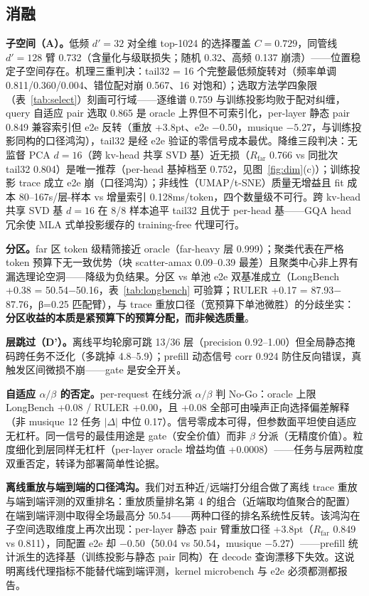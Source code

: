 \documentclass[11pt]{article}
\begin{document}
\subsection{消融}

\textbf{子空间（A）。}低频 $d'{=}32$ 对全维 top-1024 的选择覆盖 $C{=}0.729$，同管线 $d'{=}128$ 臂 0.732（含量化与级联损失；随机 0.32、高频 0.137 崩溃）——位置稳定子空间存在。机理三重判决：tail32 = 16 个完整最低频旋转对（频率单调 0.811/0.360/0.004、错位配对崩 0.567、16 对饱和）；选取方法学四象限（表~\ref{tab:select}）刻画可行域——逐维谱 0.759 与训练投影均败于配对纠缠，query 自适应 pair 选取 0.865 是 oracle 上界但不可索引化，per-layer 静态 pair 0.849 兼容索引但 e2e 反转（重放 +3.8pt、e2e $-0.50$，musique $-5.27$，与训练投影同构的口径鸿沟），tail32 是经 e2e 验证的零信号成本最优。降维三段判决：无监督 PCA $d{=}16$（跨 kv-head 共享 SVD 基）近无损（$R_{\mathrm{far}}$ 0.766 vs 同批次 tail32 0.804）是唯一推荐（per-head 基掉档至 0.752，见图~\ref{fig:dim}(c)）；训练投影 trace 成立 e2e 崩（口径鸿沟）；非线性（UMAP/t-SNE）质量无增益且 fit 成本 80--167s/层-样本 vs 增量索引 0.128ms/token，四个数量级不可行。跨 kv-head 共享 SVD 基 $d{=}16$ 在 8/8 样本追平 tail32 且优于 per-head 基——GQA head 冗余使 MLA 式单投影缓存的 training-free 代理可行。

\textbf{分区。}far 区 token 级精筛接近 oracle（far-heavy 层 0.999）；聚类代表在严格 token 预算下无一致优势（块 scatter-amax 0.09--0.39 最差）且聚类中心非上界有漏选理论空洞——降级为负结果。分区 vs 单池 e2e 双基准成立（LongBench +0.38 = 50.54$-$50.16，表~\ref{tab:longbench} 可验算；RULER +0.17 = 87.93$-$87.76，β=0.25 匹配臂），与 trace 重放口径（宽预算下单池微胜）的分歧坐实：\textbf{分区收益的本质是紧预算下的预算分配，而非候选质量}。

\textbf{层跳过（D'）。}离线平均轮廓可跳 13/36 层（precision 0.92--1.00）但全局静态掩码跨任务不泛化（多跳掉 4.8--5.9）；prefill 动态信号 corr 0.924 防住反向错误，真触发区间微损不崩——gate 是安全开关。

\textbf{自适应 $\alpha/\beta$ 的否定。}per-request 在线分派 $\alpha/\beta$ 判 No-Go：oracle 上限 LongBench +0.08 / RULER +0.00，且 +0.08 全部可由噪声正向选择偏差解释（非 musique 12 任务 $|\Delta|$ 中位 0.17）。信号零成本可得，但参数面平坦使自适应无杠杆。同一信号的最佳用途是 gate（安全价值）而非 $\beta$ 分派（无精度价值）。粒度细化到层同样无杠杆（per-layer oracle 增益均值 +0.0008）——任务与层两粒度双重否定，转译为部署简单性论据。

\textbf{离线重放与端到端的口径鸿沟。}我们对五种近/远端打分组合做了离线 trace 重放与端到端评测的双重排名：重放质量排名第 4 的组合（近端取均值聚合的配置）在端到端评测中取得全场最高分 50.54——两种口径的排名系统性反转。该鸿沟在子空间选取维度上再次出现：per-layer 静态 pair 臂重放口径 +3.8pt（$R_{\mathrm{far}}$ 0.849 vs 0.811），同配置 e2e 却 $-0.50$（50.04 vs 50.54，musique $-5.27$）——prefill 统计派生的选择基（训练投影与静态 pair 同构）在 decode 查询漂移下失效。这说明离线代理指标不能替代端到端评测，kernel microbench 与 e2e 必须都测都报告。
\end{document}
